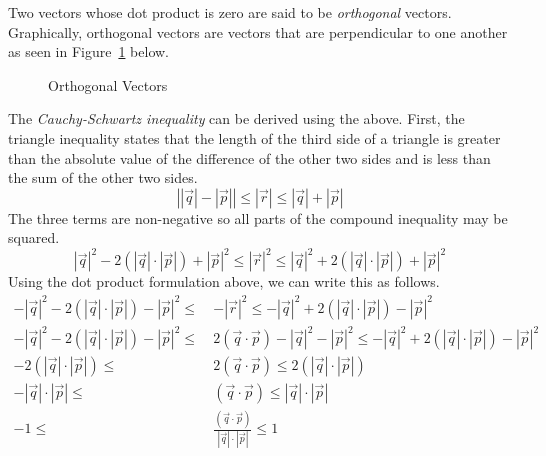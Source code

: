 \documentclass[12pt]{article}
\begin{document}
 Two vectors whose dot product is zero are said to be \emph{orthogonal} vectors. Graphically, orthogonal vectors are vectors that are perpendicular to one another as seen in Figure~\ref{fig:orgthogonalvectors} below. \\

\begin{figure}[h!]
\centering
\caption{Orthogonal Vectors}
\label{fig:orgthogonalvectors}
\end{figure}

The \emph{Cauchy-Schwartz inequality} can be derived using the above. First, the triangle inequality states that the length of the third side of a triangle is greater than the absolute value of the difference of the other two sides and is less than the sum of the other two sides.
\[
\left|  |\vec{q}|-|\vec{p}| \right| \leq |\vec{r}| \leq |\vec{q}|+|\vec{p}|
\]
The three terms are non-negative so all parts of the compound inequality may be squared.
\[
  |\vec{q}|^2-2(|\vec{q}|\cdot|\vec{p}|)+|\vec{p}|^2  \leq |\vec{r}|^2 \leq |\vec{q}|^2+2(|\vec{q}|\cdot|\vec{p}|)+|\vec{p}|^2
\]
Using the dot product formulation above, we can write this as follows.
\begin{align*}
 - |\vec{q}|^2-2(|\vec{q}|\cdot|\vec{p}|)-|\vec{p}|^2  \leq\ & -|\vec{r}|^2 \leq -|\vec{q}|^2+2(|\vec{q}|\cdot|\vec{p}|)-|\vec{p}|^2 \\
 - |\vec{q}|^2-2(|\vec{q}|\cdot|\vec{p}|)-|\vec{p}|^2  \leq\ & 2(\vec{q}\cdot\vec{p}) - |\vec{q}|^2 - |\vec{p}|^2   \leq -|\vec{q}|^2+2(|\vec{q}|\cdot|\vec{p}|)-|\vec{p}|^2 \\
-2(|\vec{q}|\cdot|\vec{p}|)  \leq\ & 2(\vec{q}\cdot\vec{p})   \leq 2(|\vec{q}|\cdot|\vec{p}|) \\
-|\vec{q}|\cdot|\vec{p}|  \leq\ & (\vec{q}\cdot\vec{p})   \leq |\vec{q}|\cdot|\vec{p}| \\
-1  \leq\ & \frac{(\vec{q}\cdot\vec{p})}{|\vec{q}|\cdot|\vec{p}|}   \leq 1 \\
\end{align*}
\end{document}
